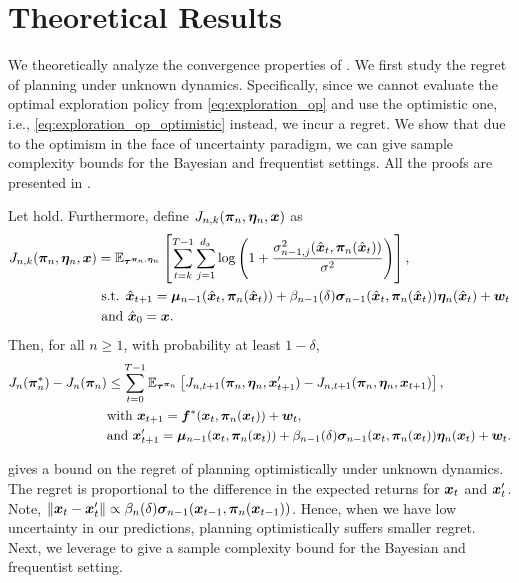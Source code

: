 \section{Theoretical Results} \label{sec:theoretical_results}
We theoretically analyze the convergence properties of \opacex. We first study the regret of planning under unknown dynamics. Specifically, since we cannot evaluate the optimal exploration policy from \cref{eq:exploration_op} and use the optimistic one, i.e., \cref{eq:exploration_op_optimistic} instead, we incur a regret. We show that due to the optimism in the face of uncertainty paradigm, we can give sample complexity bounds for the Bayesian and frequentist settings. All the proofs are presented in .
\begin{lemma}\label{lem:optimistic_planning_regret}
Let  hold. 
Furthermore, define  $J_{n, k}({\bm{\pi}}_n, {\bm{\eta}}_n, {\bm{x}})$ as 
\begin{align*}
    J_{n, k}({\bm{\pi}}_n, {\bm{\eta}}_n, {\bm{x}}) &= \mathbb{E}_{{\bm{\tau}}^{{\bm{\pi}}_n, {\bm{\eta}}_n}}\left[\sum_{t=k}^{T-1} \sum^{d_x}_{j=1} \log \left(1 + \frac{\sigma_{n-1, j}^2({\hat{\bm{x}}}_t, {\bm{\pi}}_n({\hat{\bm{x}}}_t))}{\sigma^2}\right)\right],   \\ &\text{ s.t. }  {\hat{\bm{x}}}_{t+1} = {\bm{\mu}}_{n-1}({\hat{\bm{x}}}_t, {\bm{\pi}}_n({\hat{\bm{x}}}_t)) + \beta_{n-1}(\delta){\bm{\sigma}}_{n-1}({\hat{\bm{x}}}_t, {\bm{\pi}}_n({\hat{\bm{x}}}_t)) {\bm{\eta}}_n({\hat{\bm{x}}}_t) + {\bm{w}}_t \\
      &\text{ and } {\hat{\bm{x}}}_0 = {\bm{x}}.
\end{align*}
Then, for all $n \geq 1$, with probability at least $1-\delta$,
\begin{align*}
    J_n({\bm{\pi}}_n^*) - J_n({\bm{\pi}}_n) &\leq \sum^{T-1}_{t=0} \mathbb{E}_{{\bm{\tau}}^{{\bm{\pi}}_n}}\left[J_{n, t+1}({\bm{\pi}}_n, {\bm{\eta}}_n, {\bm{x}}'_{t+1}) - J_{n, t+1}({\bm{\pi}}_n, {\bm{\eta}}_n, {\bm{x}}_{t+1}) \right], \\
    &\text{with } {\bm{x}}_{t+1} = {\bm{f}}^*({\bm{x}}_{t}, {\bm{\pi}}_n({\bm{x}}_t)) + {\bm{w}}_t, \\
    &\text{and } {\bm{x}}'_{t+1} = {\bm{\mu}}_{n-1}({\bm{x}}_t, {\bm{\pi}}_n({\bm{x}}_t)) + \beta_{n-1}(\delta){\bm{\sigma}}_{n-1}({\bm{x}}_t, {\bm{\pi}}_n({\bm{x}}_t)) {\bm{\eta}}_n({\bm{x}}_t) + {\bm{w}}_t.
\end{align*}
\end{lemma}
 gives a bound on the regret of planning optimistically under unknown dynamics. The regret is proportional to the difference in the expected returns for ${\bm{x}}_t$ and ${\bm{x}}'_t$. Note, $\left\lVert{\bm{x}}_t - {\bm{x}}'_t\right\rVert \propto \beta_n(\delta){\bm{\sigma}}_{n-1}({\bm{x}}_{t-1}, {\bm{\pi}}_n({\bm{x}}_{t-1}))$. Hence, when we have low uncertainty in our predictions, planning optimistically suffers smaller regret. Next, we leverage  to give a sample complexity bound for the Bayesian and frequentist setting.
